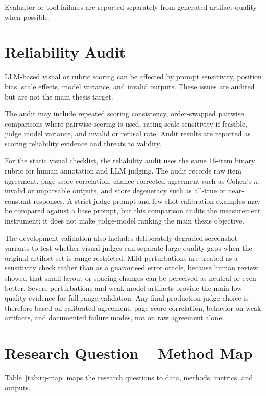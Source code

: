 Evaluator or tool failures are reported separately from generated-artifact
quality when possible.

\section{Reliability Audit}
\label{sec:reliability-audit}

LLM-based visual or rubric scoring can be affected by prompt sensitivity,
position bias, scale effects, model variance, and invalid outputs. These issues
are audited but are not the main thesis target.

The audit may include repeated scoring consistency, order-swapped pairwise
comparisons where pairwise scoring is used, rating-scale sensitivity if
feasible, judge model variance, and invalid or refusal rate. Audit results are
reported as scoring reliability evidence and threats to validity.

For the static visual checklist, the reliability audit uses the same
16-item binary rubric for human annotation and LLM judging. The audit records
raw item agreement, page-score correlation, chance-corrected agreement such as
Cohen's \(\kappa\), invalid or unparsable outputs, and score degeneracy such as
all-true or near-constant responses. A strict judge prompt and few-shot
calibration examples may be compared against a base prompt, but this comparison
audits the measurement instrument; it does not make judge-model ranking the
main thesis objective.

The development validation also includes deliberately degraded screenshot
variants to test whether visual judges can separate large quality gaps when the
original artifact set is range-restricted. Mild perturbations are treated as a
sensitivity check rather than as a guaranteed error oracle, because human
review showed that small layout or spacing changes can be perceived as neutral
or even better. Severe perturbations and weak-model artifacts provide the main
low-quality evidence for full-range validation. Any final production-judge
choice is therefore based on calibrated agreement, page-score correlation,
behavior on weak artifacts, and documented failure modes, not on raw agreement
alone.

\section{Research Question -- Method Map}
\label{sec:rq-map}

Table~\ref{tab:rq-map} maps the research questions to data, methods, metrics,
and outputs.

